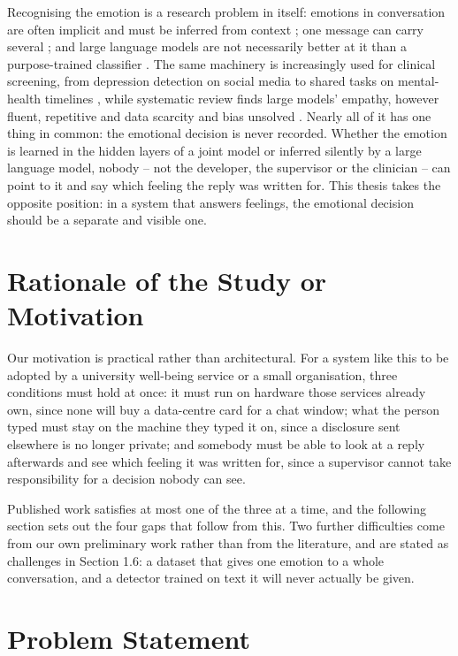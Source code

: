 Recognising the emotion is a research problem in itself: emotions in conversation are often implicit and must be inferred from context \cite{poria2019erc,koga2023implicit}; one message can carry several \cite{belay2025}; and large language models are not necessarily better at it than a purpose-trained classifier \cite{feng2023affect}. The same machinery is increasingly used for clinical screening, from depression detection on social media \cite{lan2024depression} to shared tasks on mental-health timelines \cite{tseriotou2025clpsych}, while systematic review finds large models' empathy, however fluent, repetitive \cite{sorin2024jmir} and data scarcity and bias unsolved \cite{kumar2024unlocking}. Nearly all of it has one thing in common: the emotional decision is never recorded. Whether the emotion is learned in the hidden layers of a joint model or inferred silently by a large language model, nobody -- not the developer, the supervisor or the clinician -- can point to it and say which feeling the reply was written for. This thesis takes the opposite position: in a system that answers feelings, the emotional decision should be a separate and visible one.

\section{Rationale of the Study or Motivation}
\label{sec:1.2}

Our motivation is practical rather than architectural. For a system like this to be adopted by a university well-being service or a small organisation, three conditions must hold at once: it must run on hardware those services already own, since none will buy a data-centre card for a chat window; what the person typed must stay on the machine they typed it on, since a disclosure sent elsewhere is no longer private; and somebody must be able to look at a reply afterwards and see which feeling it was written for, since a supervisor cannot take responsibility for a decision nobody can see.

Published work satisfies at most one of the three at a time, and the following section sets out the four gaps that follow from this. Two further difficulties come from our own preliminary work rather than from the literature, and are stated as challenges in Section 1.6: a dataset that gives one emotion to a whole conversation, and a detector trained on text it will never actually be given.

\section{Problem Statement}
\label{sec:1.3}

